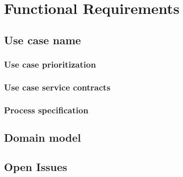 \documentclass{article}
\begin{document}
\section{Functional Requirements}

	\subsection{Use case name}
		\subsubsection{Use case prioritization}
		\subsubsection{Use case service contracts}
		\subsubsection{Process specification}
	
	\subsection{Domain model}
	\subsection{Open Issues}


	
\end{document}
